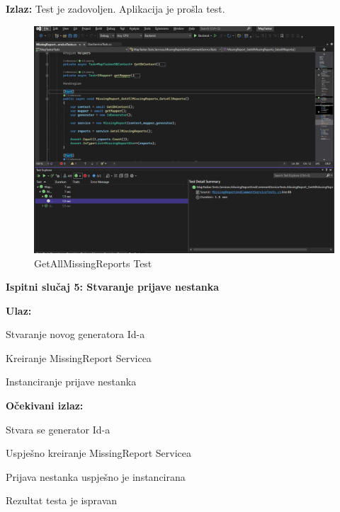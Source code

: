 			\noindent \textbf{Izlaz:} Test je zadovoljen. Aplikacija je prošla test.
			
			\begin{figure}[H] \includegraphics[width=\linewidth]{./slike/Testovi/Unit/UnitTest_4.png}
				\caption{GetAllMissingReports Test}
			\end{figure}
			
			\eject
			
			\noindent \textbf{Ispitni slučaj 5: Stvaranje prijave nestanka}
			
			\noindent \textbf{Ulaz:}
			
			\begin{packed_enum}
				
				\item Stvaranje novog generatora Id-a
				\item Kreiranje MissingReport Servicea
				\item Instanciranje prijave nestanka
				
			\end{packed_enum}
			
			\noindent \textbf{Očekivani izlaz:}
			
			\begin{packed_enum}
				
				\item Stvara se generator Id-a
				\item Uspješno kreiranje MissingReport Servicea
				\item Prijava nestanka uspješno je instancirana
				\item Rezultat testa je ispravan
				
			\end{packed_enum}
			
